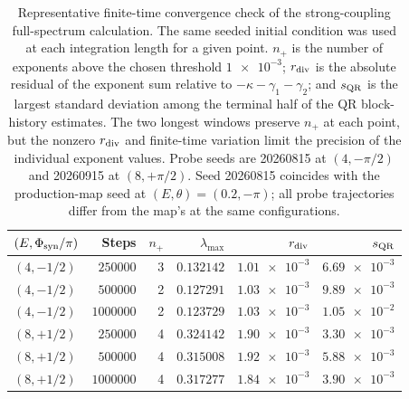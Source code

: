 \documentclass[preprint,numbers,a4paper]{elsarticle}
\begin{document}
\begin{table}[h]
  \centering
  \caption{Representative finite-time convergence check of the strong-coupling full-spectrum calculation. The same seeded initial condition was used at each integration length for a given point. $n_{+}$ is the number of exponents above the chosen threshold $\num{1e-3}$; $r_{\rm div}$ is the absolute residual of the exponent sum relative to $-\kappa-\gamma_1-\gamma_2$; and $s_{\rm QR}$ is the largest standard deviation among the terminal half of the QR block-history estimates. The two longest windows preserve $n_{+}$ at each point, but the nonzero $r_{\rm div}$ and finite-time variation limit the precision of the individual exponent values. Probe seeds are \num{20260815} at $(4,-\pi/2)$ and \num{20260915} at $(8,+\pi/2)$. Seed \num{20260815} coincides with the production-map seed at $(E,\theta)=(0.2,-\pi)$; all probe trajectories differ from the map's at the same configurations.}
  \label{SI-tab:si-hyperchaos-convergence}
  \begin{tabular}{@{}lrrrrr@{}}
    \toprule
    $(E,\Phi_{\rm syn}/\pi)$ & Steps & $n_{+}$ & $\lambda_{\max}$ & $r_{\rm div}$ & $s_{\rm QR}$ \\
    \midrule
    $(4,-1/2)$ & $\num{250000}$ & 3 & $\num{0.132142}$ & $\num{1.01e-3}$ & $\num{6.69e-3}$ \\
    $(4,-1/2)$ & $\num{500000}$ & 2 & $\num{0.127291}$ & $\num{1.03e-3}$ & $\num{9.89e-3}$ \\
    $(4,-1/2)$ & $\num{1000000}$ & 2 & $\num{0.123729}$ & $\num{1.03e-3}$ & $\num{1.05e-2}$ \\
    $(8,+1/2)$ & $\num{250000}$ & 4 & $\num{0.324142}$ & $\num{1.90e-3}$ & $\num{3.30e-3}$ \\
    $(8,+1/2)$ & $\num{500000}$ & 4 & $\num{0.315008}$ & $\num{1.92e-3}$ & $\num{5.88e-3}$ \\
    $(8,+1/2)$ & $\num{1000000}$ & 4 & $\num{0.317277}$ & $\num{1.84e-3}$ & $\num{3.90e-3}$ \\
    \bottomrule
  \end{tabular}
\end{table}
\end{document}
